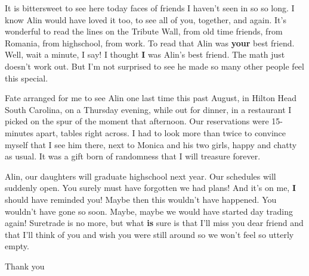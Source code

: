 \documentclass[12pt]{article}
\begin{document}
\bigskip
It is bittersweet to see here today faces of friends I haven't 
seen in so so long.  I know Alin would have loved it too, to see 
all of you, together, and again.  It's wonderful to read the lines on 
the Tribute Wall, from old time friends, from Romania, from highschool, 
from work.  To read that Alin was {\bf your} best friend.  Well, 
wait a minute, I say! I thought {\bf I} was Alin's best friend.  
The math just doesn't work out.  But I'm not surprised to see he made 
so many other people feel this special. 

\bigskip
Fate arranged for me to see Alin one last time this past August, in 
Hilton Head South Carolina, on a Thursday evening, while out for dinner, 
in a restaurant I picked on the spur of the moment that afternoon. 
Our reservations were 15-minutes apart, tables right across.  I had 
to look more than twice to convince myself that I see him there, next to 
Monica and his two girls, happy and chatty as usual.  It was a gift 
born of randomness that I will treasure forever. 

\bigskip
Alin, our daughters will graduate highschool next year.  Our schedules 
will suddenly open.  You surely must have forgotten we had plans!  
And it's on me, {\bf I} should have reminded you!  Maybe then this 
wouldn't have happened.  You wouldn't have gone so soon.  Maybe, 
maybe we would have started day trading again!  Suretrade is no more, 
but what {\bf is} sure is that I'll miss you dear friend and that I'll 
think of you and wish you were still around so we won't feel so 
utterly empty. 

\bigskip
Thank you
\end{document}
